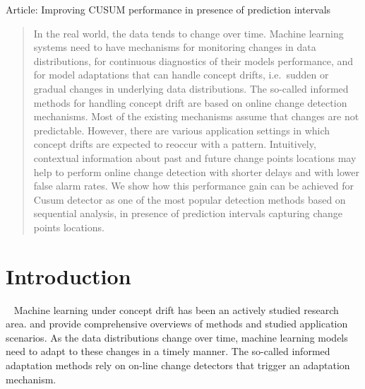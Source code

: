 Article: Improving CUSUM performance in presence of prediction intervals

\begin{abstract}
In the real world, the data tends to change over time.
Machine learning systems need to have mechanisms for monitoring changes in data distributions, for continuous diagnostics of their models performance, and for model adaptations that can handle concept drifts, i.e.\ sudden or gradual changes in underlying data distributions.
The so-called informed methods for handling concept drift are based on online change detection mechanisms. Most of the existing mechanisms assume that changes are not predictable.
However, there are various application settings in which concept drifts are expected to reoccur with a pattern.
Intuitively, contextual information about past and future change points locations may help to perform online change detection with shorter delays and with lower false alarm rates.
We show how this performance gain can be achieved for Cusum detector as one of the most popular detection methods based on sequential analysis, in presence of prediction intervals capturing change points locations.
\end{abstract}


\section{Introduction}~\label{sec:intro}
Machine learning under concept drift has been an actively studied research area. \cite{gama2014survey} and \cite{zliobaite2016overview} provide comprehensive overviews of methods and studied application scenarios. As the data distributions change over time, machine learning models need to adapt to these changes in a timely manner. The so-called informed adaptation methods rely on on-line change detectors that trigger an adaptation mechanism. 

